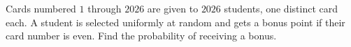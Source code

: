 Cards numbered $1$ through $2026$ are given to $2026$ students, one distinct card each. A student is selected uniformly at random and gets a bonus point if their card number is even. Find the probability of receiving a bonus.

